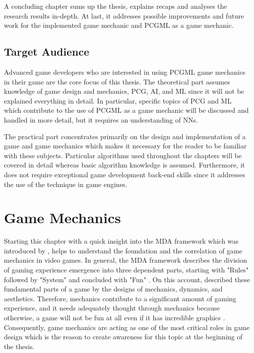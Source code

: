 \documentclass[MGS,Master,english]{twbook}%
\begin{document}
A concluding chapter sums up the thesis, explains recaps and analyses the research results in-depth. At last, it addresses possible improvements and future work for the implemented game mechanic and \ac{PCGML} as a game mechanic.

\section{Target Audience}
Advanced game developers who are interested in using \ac{PCGML} game mechanics in their game are the core focus of this thesis. The theoretical part assumes knowledge of game design and mechanics, \ac{PCG}, \ac{AI}, and \ac{ML} since it will not be explained everything in detail. In particular, specific topics of \ac{PCG} and \ac{ML} which contribute to the use of \ac{PCGML} as a game mechanic will be discussed and handled in more detail, but it requires an understanding of \acp{NN}.

The practical part concentrates primarily on the design and implementation of a game and game mechanics which makes it necessary for the reader to be familiar with these subjects. Particular algorithms used throughout the chapters will be covered in detail whereas basic algorithm knowledge is assumed. Furthermore, it does not require exceptional game development back-end skills since it addresses the use of the technique in game engines.

%
%
\clearpage
\chapter{Game Mechanics} \label{gameMechanicsChapter}
Starting this chapter with a quick insight into the \ac{MDA} framework which was introduced by \citep{mechanic::MDA}, helps to understand the foundation and the correlation of game mechanics in video games. In general, the \ac{MDA} framework describes the division of gaming experience emergence into three dependent parts, starting with "Rules" followed by "System" and concluded with "Fun" \cite{mechanic::MDA}.  On this account, \citep{mechanic::MDA} described these fundamental parts of a game by the designs of mechanics, dynamics, and aesthetics. Therefore, mechanics contribute to a significant amount of gaming experience, and it needs adequately thought through mechanics because otherwise, a game will not be fun at all even if it has incredible graphics \cite{gameDesign::gameMechanicsAdvancedGameDesign}. Consequently, game mechanics are acting as one of the most critical roles in game design which is the reason to create awareness for this topic at the beginning of the thesis.
\end{document}
